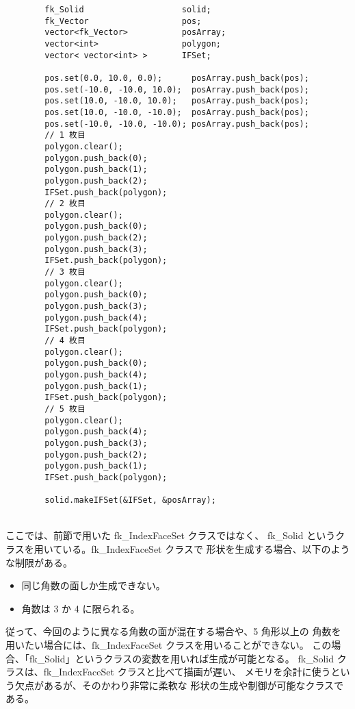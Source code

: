 \begin{breakbox}
\begin{verbatim}
        fk_Solid                    solid;
        fk_Vector                   pos;
        vector<fk_Vector>           posArray;
        vector<int>                 polygon;
        vector< vector<int> >       IFSet;
    
        pos.set(0.0, 10.0, 0.0);      posArray.push_back(pos);
        pos.set(-10.0, -10.0, 10.0);  posArray.push_back(pos);
        pos.set(10.0, -10.0, 10.0);   posArray.push_back(pos);
        pos.set(10.0, -10.0, -10.0);  posArray.push_back(pos);
        pos.set(-10.0, -10.0, -10.0); posArray.push_back(pos);
        // 1 枚目
        polygon.clear();
        polygon.push_back(0);
        polygon.push_back(1);
        polygon.push_back(2);
        IFSet.push_back(polygon);
        // 2 枚目
        polygon.clear();
        polygon.push_back(0);
        polygon.push_back(2);
        polygon.push_back(3);
        IFSet.push_back(polygon);
        // 3 枚目
        polygon.clear();
        polygon.push_back(0);
        polygon.push_back(3);
        polygon.push_back(4);
        IFSet.push_back(polygon);
        // 4 枚目
        polygon.clear();
        polygon.push_back(0);
        polygon.push_back(4);
        polygon.push_back(1);
        IFSet.push_back(polygon);
        // 5 枚目
        polygon.clear();
        polygon.push_back(4);
        polygon.push_back(3);
        polygon.push_back(2);
        polygon.push_back(1);
        IFSet.push_back(polygon);

        solid.makeIFSet(&IFSet, &posArray);
\end{verbatim}
\end{breakbox}
~ \\
ここでは、前節で用いた fk\_IndexFaceSet クラスではなく、
fk\_Solid というクラスを用いている。fk\_IndexFaceSet クラスで
形状を生成する場合、以下のような制限がある。
\begin{itemize}
 \item 同じ角数の面しか生成できない。
 \item 角数は 3 か 4 に限られる。
\end{itemize}
従って、今回のように異なる角数の面が混在する場合や、5 角形以上の
角数を用いたい場合には、fk\_IndexFaceSet クラスを用いることができない。
この場合、「fk\_Solid」というクラスの変数を用いれば生成が可能となる。
fk\_Solid クラスは、fk\_IndexFaceSet クラスと比べて描画が遅い、
メモリを余計に使うという欠点があるが、そのかわり非常に柔軟な
形状の生成や制御が可能なクラスである。

